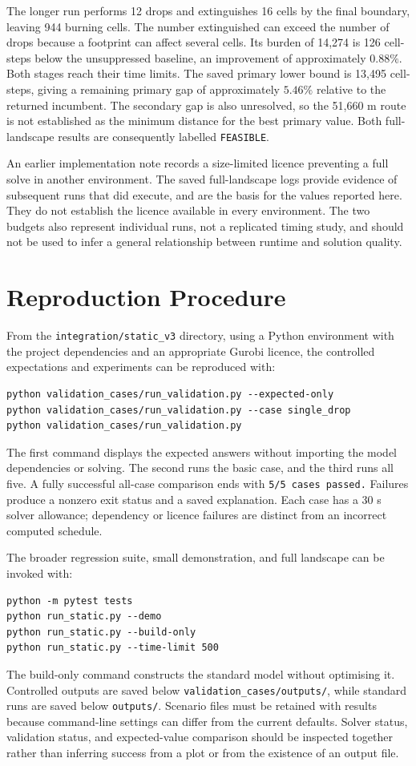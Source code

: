 The longer run performs 12 drops and extinguishes 16 cells by the final boundary, leaving 944 burning cells. The number extinguished can exceed the number of drops because a footprint can affect several cells. Its burden of 14,274 is 126 cell-steps below the unsuppressed baseline, an improvement of approximately $0.88\%$. Both stages reach their time limits. The saved primary lower bound is 13,495 cell-steps, giving a remaining primary gap of approximately $5.46\%$ relative to the returned incumbent. The secondary gap is also unresolved, so the 51,660 m route is not established as the minimum distance for the best primary value. Both full-landscape results are consequently labelled \texttt{FEASIBLE}.

An earlier implementation note records a size-limited licence preventing a full solve in another environment. The saved full-landscape logs provide evidence of subsequent runs that did execute, and are the basis for the values reported here. They do not establish the licence available in every environment. The two budgets also represent individual runs, not a replicated timing study, and should not be used to infer a general relationship between runtime and solution quality.

\section{Reproduction Procedure}
\label{sec:validation-reproduction}

From the \texttt{integration/static\_v3} directory, using a Python environment with the project dependencies and an appropriate Gurobi licence, the controlled expectations and experiments can be reproduced with:
\begin{verbatim}
python validation_cases/run_validation.py --expected-only
python validation_cases/run_validation.py --case single_drop
python validation_cases/run_validation.py
\end{verbatim}
The first command displays the expected answers without importing the model dependencies or solving. The second runs the basic case, and the third runs all five. A fully successful all-case comparison ends with \texttt{5/5 cases passed.} Failures produce a nonzero exit status and a saved explanation. Each case has a 30 s solver allowance; dependency or licence failures are distinct from an incorrect computed schedule.

The broader regression suite, small demonstration, and full landscape can be invoked with:
\begin{verbatim}
python -m pytest tests
python run_static.py --demo
python run_static.py --build-only
python run_static.py --time-limit 500
\end{verbatim}
The build-only command constructs the standard model without optimising it. Controlled outputs are saved below \texttt{validation\_cases/outputs/}, while standard runs are saved below \texttt{outputs/}. Scenario files must be retained with results because command-line settings can differ from the current defaults. Solver status, validation status, and expected-value comparison should be inspected together rather than inferring success from a plot or from the existence of an output file.

